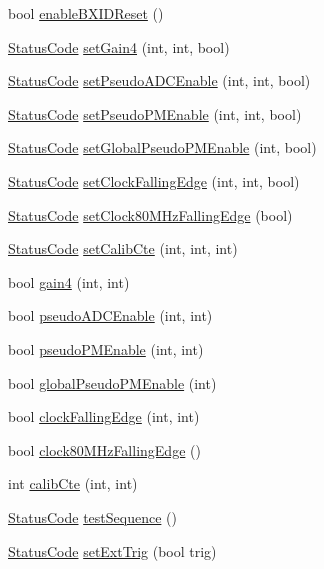 \begin{DoxyCompactItemize}
\item 
bool \hyperlink{classFEB__v1_ac8186be2d5fd8122092d6475e77395e9}{enableBXIDReset} ()
\item 
\hyperlink{classStatusCode}{StatusCode} \hyperlink{classFEB__v1_ac30cac86837c86e4f03cb51fff6226cd}{setGain4} (int, int, bool)
\item 
\hyperlink{classStatusCode}{StatusCode} \hyperlink{classFEB__v1_a244c472d16ea6778cf6ec93943a060a5}{setPseudoADCEnable} (int, int, bool)
\item 
\hyperlink{classStatusCode}{StatusCode} \hyperlink{classFEB__v1_af422c3cf889440d5d49cce51d98b496e}{setPseudoPMEnable} (int, int, bool)
\item 
\hyperlink{classStatusCode}{StatusCode} \hyperlink{classFEB__v1_adce2d9c70235f4226ab59aea3dc5953c}{setGlobalPseudoPMEnable} (int, bool)
\item 
\hyperlink{classStatusCode}{StatusCode} \hyperlink{classFEB__v1_af2bb7bacef6c06d15e2c9e47c373de08}{setClockFallingEdge} (int, int, bool)
\item 
\hyperlink{classStatusCode}{StatusCode} \hyperlink{classFEB__v1_a9ccd318b9a80b1cbd554ec6fe461cd82}{setClock80MHzFallingEdge} (bool)
\item 
\hyperlink{classStatusCode}{StatusCode} \hyperlink{classFEB__v1_acf3c8ad478ce506bb9d9cb3e4d3b6252}{setCalibCte} (int, int, int)
\item 
bool \hyperlink{classFEB__v1_a6b05c21a70fbb2e88f8e1f991a117b49}{gain4} (int, int)
\item 
bool \hyperlink{classFEB__v1_aeb6c988faf48d93637ef669c54e25223}{pseudoADCEnable} (int, int)
\item 
bool \hyperlink{classFEB__v1_ab6b076d6e1372bfa8d9fd2916b1b52cd}{pseudoPMEnable} (int, int)
\item 
bool \hyperlink{classFEB__v1_acfaf998ce0166362401e5253502a16d2}{globalPseudoPMEnable} (int)
\item 
bool \hyperlink{classFEB__v1_aa9f591714dce594562e3e959b105a580}{clockFallingEdge} (int, int)
\item 
bool \hyperlink{classFEB__v1_a8518757e40b372f784674da1a2c41091}{clock80MHzFallingEdge} ()
\item 
int \hyperlink{classFEB__v1_ad3893c8062c75d1f9695c196c95703c7}{calibCte} (int, int)
\item 
\hyperlink{classStatusCode}{StatusCode} \hyperlink{classFEB__v1_a7b948b40f3034ccfb0a696b5cf9c5c6c}{testSequence} ()
\item 
\hyperlink{classStatusCode}{StatusCode} \hyperlink{classFEB__v1_aea3b1f84ea9be2e5c55a93ae215c8a35}{setExtTrig} (bool trig)

\end{DoxyCompactItemize}
